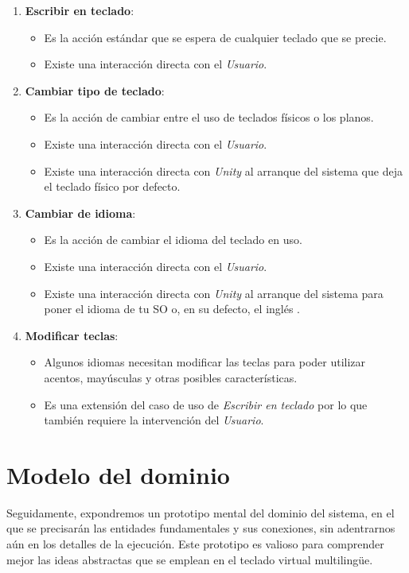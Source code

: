 \begin{enumerate}
	\item \textbf{Escribir en teclado}:
		\begin{itemize}
			\item Es la acción estándar que se espera de cualquier teclado que se precie.
			\item Existe una interacción directa con el \textit{Usuario}.
		\end{itemize}
	\item \textbf{Cambiar tipo de teclado}:
		\begin{itemize}
			\item Es la acción de cambiar entre el uso de teclados físicos o los planos.
			\item Existe una interacción directa con el \textit{Usuario}.
			\item Existe una interacción directa con \textit{Unity} al arranque del sistema que deja el teclado físico por defecto.
		\end{itemize}
	\item \textbf{Cambiar de idioma}:
		\begin{itemize}
			\item Es la acción de cambiar el idioma del teclado en uso.
			\item Existe una interacción directa con el \textit{Usuario}.
			\item Existe una interacción directa con \textit{Unity} al arranque del sistema para poner el idioma de tu SO o, en su defecto, el inglés
			.
		\end{itemize}
	\item \textbf{Modificar teclas}:
	\begin{itemize}
		\item Algunos idiomas necesitan modificar las teclas para poder utilizar acentos, mayúsculas y otras posibles características.
		\item Es una extensión del caso de uso de \textit{Escribir en teclado} por lo que también requiere la intervención del \textit{Usuario}.
	\end{itemize}
\end{enumerate}

\section{Modelo del dominio}

Seguidamente, expondremos un prototipo mental del dominio del sistema, en el que se precisarán las entidades fundamentales y sus conexiones, sin adentrarnos aún en los detalles de la ejecución. Este prototipo es valioso para comprender mejor las ideas abstractas que se emplean en el teclado virtual multilingüe.

